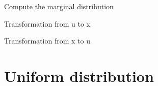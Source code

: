 \documentclass[letterpaper,10pt,english]{sphinxmanual}
\begin{document}
\begin{fulllineitems}
\begin{fulllineitems}
Compute the marginal distribution

\end{fulllineitems}



\begin{fulllineitems}
Transformation from u to x

\end{fulllineitems}



\begin{fulllineitems}
Transformation from x to u

\end{fulllineitems}


\end{fulllineitems}



\section{Uniform distribution}
\label{distributions:uniform-distribution}
\end{document}
